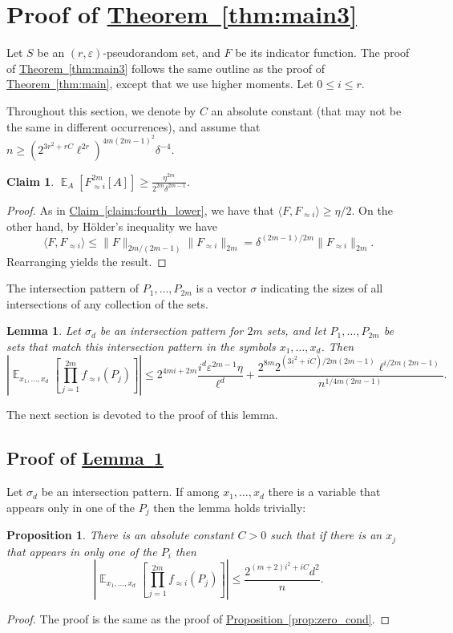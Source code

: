 \documentclass[11pt]{article}
\newcommand{\expref}[2]{\texorpdfstring{\hyperref[#2]{#1~\ref{#2}}}{#1~\ref{#2}}}
\newtheorem{lemma}[theorem]{Lemma}
\newtheorem{claim}[theorem]{Claim}
\newtheorem{proposition}[theorem]{Proposition}
\newcommand\card[1]{\left| {#1} \right|}
\newcommand\Expect[2]{{\mathop{\mathbb{E}}_{#1}\left[ {#2} \right]}}
\newcommand\norm[1]{\| #1 \|}
\newcommand\inner[2]{\langle{#1},{#2}\rangle}
\newcommand\eps{\varepsilon}
\renewcommand\geq{\geqslant}
\renewcommand\leq{\leqslant}
\newcommand\approxlvlfn[2]{{#1}_{\approx{#2}}}
\begin{document}
\section{Proof of \expref{Theorem}{thm:main3}}\label{section:imp}
Let $S$ be %
an  %
$(r,\eps)$-pseudorandom set, and $F$ be its indicator function.
The proof of \expref{Theorem}{thm:main3} follows the same outline as the proof of \expref{Theorem}{thm:main}, except that we use higher moments. Let $0\leq i\leq r$.

Throughout this section, we denote by $C$ an absolute constant (that may not be the same in different occurrences), and assume that
$n\geq (2^{3r^2+rC}\ell^{2r})^{4m(2m-1)^2}\delta^{-4}$.

\begin{claim}\label{claim:high_moment_lower}
$\Expect{A}{\approxlvlfn{F}{i}^{2m}[A]}\geq \frac{\eta^{2m}}{2^{2m}\delta^{2m-1}}$.
\end{claim}
\begin{proof}
As in \expref{Claim}{claim:fourth_lower}, we have that $\inner{F}{\approxlvlfn{F}{i}}\geq \eta/2$. On the other hand, by H\"{o}lder's inequality we have
\[
\inner{F}{\approxlvlfn{F}{i}}
\leq \norm{F}_{2m/(2m-1)}\norm{\approxlvlfn{F}{i}}_{2m}
= \delta^{(2m-1)/2m}\norm{\approxlvlfn{F}{i}}_{2m}.
\]
Rearranging %
yields   %
the result.
\end{proof}

The intersection pattern of $P_1,\ldots,P_{2m}$ is a vector $\sigma$ indicating the sizes of
all intersections of any collection of the sets.


\begin{lemma}\label{lem:high_corr}
Let $\sigma_d$ be an intersection pattern for $2m$ sets, and let $P_1,\ldots,P_{2m}$ be sets that match this intersection pattern
in the symbols $x_1,\ldots,x_d$. Then
\begin{equation}\label{eq9}
\card{\Expect{x_1,\ldots,x_d}{\prod\limits_{j=1}^{2m}{\approxlvlfn{f}{i}(P_j)}}}
\leq 2^{4mi+2m} \frac{i^{d}\eps^{2m-1}\eta}{\ell^{d}}
+ \frac{2^{8m}2^{(3i^2+iC)/2m(2m-1)} \ell^{i/2m(2m-1)}}{n^{1/4m(2m-1)}}.
\end{equation}
\end{lemma}
The next section is devoted to the proof of this lemma.


\subsection{Proof of \expref{Lemma}{lem:high_corr}}
Let $\sigma_d$ be an intersection pattern. If among $x_1,\ldots, x_d$ there is a variable that appears only in one of the %
$P_j$   %
then the lemma holds trivially:
\begin{proposition}
There is an absolute constant $C>0$ %
such that if there is
an  %
$x_j$ that appears in only
one of the %
$P_i$ then  %
\[
\card{
\Expect{x_1,...,x_d}{
\prod\limits_{j=1}^{2m}{\approxlvlfn{f}{i}(P_j)}
}}\leq \frac{2^{(m+2)i^2 + iC}d^2}{n}.
\]
\end{proposition}
\begin{proof}
The proof is the same as the proof of \expref{Proposition}{prop:zero_cond}.
\end{proof}
\end{document}
